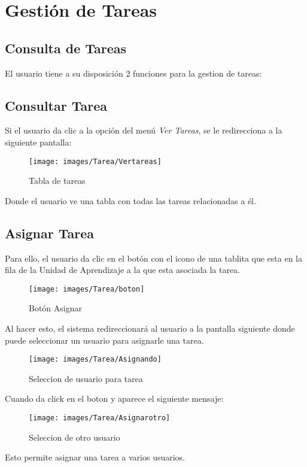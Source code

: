 \section{Gestión de Tareas}
    \subsection{Consulta de Tareas}
        El usuario tiene a su disposición 2 funciones para la gestion de tareas:

        \subsection{Consultar Tarea}

            Si el usuario da clic a la opción del menú \textit{Ver Tareas}, se le redirecciona a la siguiente pantalla:
            \begin{figure}[H]
                \centering
                \hypertarget{asignart}{\texttt{[image: images/Tarea/Vertareas]}}
                \caption{Tabla de tareas}
                \label{asignart}
            \end{figure}
            Donde el usuario ve una tabla con todas las tareas relacionadas a él.

        \subsection{Asignar Tarea}

            Para ello, el usuario da clic en el botón con el icono de una tablita que esta en la fila de la Unidad de Aprendizaje a la que esta asociada la tarea.

            \begin{figure}[H]
                \centering
                \hypertarget{boton}{\texttt{[image: images/Tarea/boton]}}
                \caption{Botón Asignar}
                \label{boton}
            \end{figure}

            Al hacer esto, el sistema redireccionará al usuario a la pantalla siguiente donde puede seleccionar un usuario para asignarle una tarea.

            \begin{figure}[H]
                \centering
                \hypertarget{asigna}{\texttt{[image: images/Tarea/Asignando]}}
                \caption{Seleccion de usuario para tarea}
                \label{asigna}
            \end{figure}

           Cuando da click en el boton  y aparece el siguiente mensaje:
            \begin{figure}[H]
                \centering
                \hypertarget{asignar}{\texttt{[image: images/Tarea/Asignarotro]}}
                \caption{Seleccion de otro usuario}
                \label{asignar}
            \end{figure}
            Esto permite asignar una tarea a varios usuarios.



